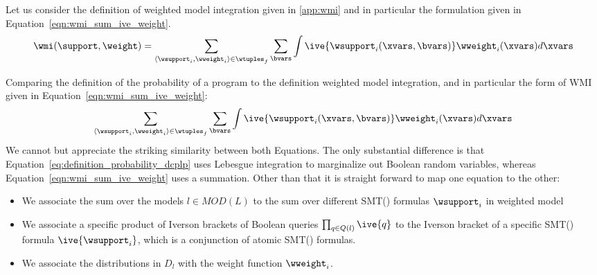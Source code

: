 
Let us consider the definition of weighted model integration given in \ref{app:wmi} and in particular the formulation given in Equation~\ref{eqn:wmi_sum_ive_weight}.
\begin{align}
	\wmi(\support, \weight) = \sum_{\langle\wsupport_i,\wweight_i\rangle \in \wtuples_f} \sum_{\bvars} \int \ive{\wsupport_i(\xvars, \bvars)} \wweight_i(\xvars) d\xvars 
\end{align}


Comparing the definition of the probability of a \dcplpsty program to the definition weighted model integration, and in particular the form of WMI given in Equation~\ref{eqn:wmi_sum_ive_weight}:
\begin{align}
	\sum_{\langle\wsupport_i,\wweight_i\rangle \in \wtuples_f} \sum_{\bvars} \int \ive{\wsupport_i(\xvars, \bvars)} \wweight_i(\xvars) d\xvars 
\end{align}
We cannot but appreciate the striking similarity between both Equations. The only substantial difference is that Equation~\ref{eq:definition_probability_dcplp} uses Lebesgue integration to marginalize out Boolean random variables, whereas Equation~\ref{eqn:wmi_sum_ive_weight} uses a summation. Other than that it is straight forward to map one equation to the other:

\begin{itemize}
	\item We associate the sum over the models $l \in MOD(L)$ to the sum over different SMT(\lra) formulas $\wsupport_i$ in weighted model
	\item We associate a specific product of Iverson brackets of Boolean queries $\prod_{q \in Q(l)} \ive{q}$ to the Iverson bracket of a specific SMT(\lra) formula $\ive{\wsupport_i}$, which is a conjunction of atomic SMT(\lra) formulas.
	\item We associate the distributions in $ D_l$ with the weight function $\wweight_i$.
\end{itemize}































